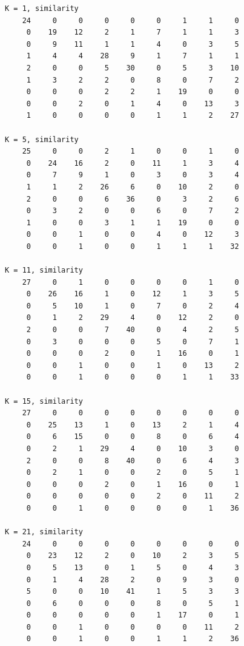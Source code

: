 \documentclass[12pt]{article}
\begin{document}
\begin{verbatim}
K = 1, similarity
    24     0     0     0     0     0     1     1     0
     0    19    12     2     1     7     1     1     3
     0     9    11     1     1     4     0     3     5
     1     4     4    28     9     1     7     1     1
     2     0     0     5    30     0     5     3    10
     1     3     2     2     0     8     0     7     2
     0     0     0     2     2     1    19     0     0
     0     0     2     0     1     4     0    13     3
     1     0     0     0     0     1     1     2    27

K = 5, similarity
    25     0     0     2     1     0     0     1     0
     0    24    16     2     0    11     1     3     4
     0     7     9     1     0     3     0     3     4
     1     1     2    26     6     0    10     2     0
     2     0     0     6    36     0     3     2     6
     0     3     2     0     0     6     0     7     2
     1     0     0     3     1     1    19     0     0
     0     0     1     0     0     4     0    12     3
     0     0     1     0     0     1     1     1    32

K = 11, similarity
    27     0     1     0     0     0     0     1     0
     0    26    16     1     0    12     1     3     5
     0     5    10     1     0     7     0     2     4
     0     1     2    29     4     0    12     2     0
     2     0     0     7    40     0     4     2     5
     0     3     0     0     0     5     0     7     1
     0     0     0     2     0     1    16     0     1
     0     0     1     0     0     1     0    13     2
     0     0     1     0     0     0     1     1    33

K = 15, similarity
    27     0     0     0     0     0     0     0     0
     0    25    13     1     0    13     2     1     4
     0     6    15     0     0     8     0     6     4
     0     2     1    29     4     0    10     3     0
     2     0     0     8    40     0     6     4     3
     0     2     1     0     0     2     0     5     1
     0     0     0     2     0     1    16     0     1
     0     0     0     0     0     2     0    11     2
     0     0     1     0     0     0     0     1    36

K = 21, similarity
    24     0     0     0     0     0     0     0     0
     0    23    12     2     0    10     2     3     5
     0     5    13     0     1     5     0     4     3
     0     1     4    28     2     0     9     3     0
     5     0     0    10    41     1     5     3     3
     0     6     0     0     0     8     0     5     1
     0     0     0     0     0     1    17     0     1
     0     0     1     0     0     0     0    11     2
     0     0     1     0     0     1     1     2    36
\end{verbatim}
\end{document}
